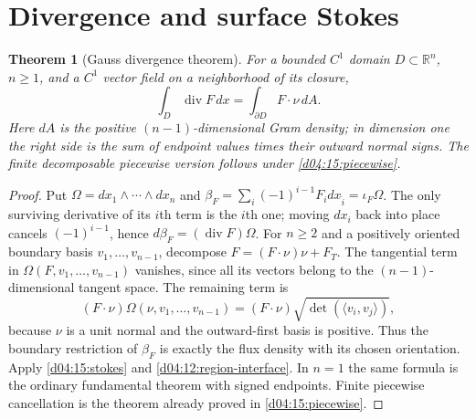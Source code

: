 \documentclass[11pt,oneside,openany]{book}
\newtheorem{theorem}{Theorem}[chapter]
\theoremstyle{definition}
\theoremstyle{remark}
\newcommand{\R}{\mathbb R}
\newcommand{\ip}[2]{\langle#1,#2\rangle}
\newcommand{\family}[1]{}
\begin{document}
\section{Divergence and surface Stokes}
\family{K04.12.03}\family{K04.12.04}
\begin{theorem}[Gauss divergence theorem]\label{d04:12:gauss}
For a bounded $C^1$ domain $D\subset\R^n$, $n\ge1$, and a $C^1$ vector
field on a neighborhood of its closure,
\[
 \int_D\operatorname{div}F\,dx=\int_{\partial D}F\cdot\nu\,dA.
\]
Here $dA$ is the positive $(n-1)$-dimensional Gram density; in dimension
one the right side is the sum of endpoint values times their outward
normal signs. The finite decomposable piecewise version follows under
\cref{d04:15:piecewise}.
\end{theorem}
\begin{proof}
Put $\Omega=dx_1\wedge\cdots\wedge dx_n$ and
$\beta_F=\sum_i(-1)^{i-1}F_i dx_{\widehat i}=\iota_F\Omega$.
The only surviving derivative of its $i$th term is the $i$th one; moving
$dx_i$ back into place cancels $(-1)^{i-1}$, hence
$d\beta_F=(\operatorname{div}F)\Omega$.
For $n\ge2$ and a positively oriented boundary basis $v_1,\ldots,v_{n-1}$,
decompose $F=(F\cdot\nu)\nu+F_T$. The tangential term in
$\Omega(F,v_1,\ldots,v_{n-1})$ vanishes, since all its vectors belong
to the $(n-1)$-dimensional tangent space. The remaining term is
\[
 (F\cdot\nu)\Omega(\nu,v_1,\ldots,v_{n-1})
 =(F\cdot\nu)\sqrt{\det(\ip{v_i}{v_j})},
\]
because $\nu$ is a unit normal and the outward-first basis is positive.
Thus the boundary restriction of $\beta_F$ is exactly the flux density
with its chosen orientation. Apply \cref{d04:15:stokes} and
\cref{d04:12:region-interface}. In $n=1$ the same formula is the ordinary
fundamental theorem with signed endpoints. Finite piecewise cancellation
is the theorem already proved in \cref{d04:15:piecewise}.
\end{proof}
\end{document}
